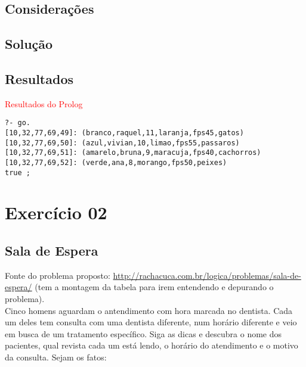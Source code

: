 \documentclass[final,a4paper]{article}
\begin{document}
\subsection{Considerações}

\subsection{Solução}


\subsection{Resultados}

\textcolor{red}{Resultados do  Prolog}

\begin{verbatim}
?- go.
[10,32,77,69,49]: (branco,raquel,11,laranja,fps45,gatos)
[10,32,77,69,50]: (azul,vivian,10,limao,fps55,passaros)
[10,32,77,69,51]: (amarelo,bruna,9,maracuja,fps40,cachorros)
[10,32,77,69,52]: (verde,ana,8,morango,fps50,peixes)
true ;
\end{verbatim}



\section{Exercício 02}


\subsection{Sala de Espera}

 Fonte do problema proposto:
  \url{http://rachacuca.com.br/logica/problemas/sala-de-espera/} (tem a montagem da tabela para irem entendendo e depurando o problema).\\
  Cinco homens aguardam o antendimento com hora marcada no dentista. Cada um deles tem consulta com uma dentista diferente, num horário diferente e veio em busca de um tratamento específico.
Siga as dicas e descubra o nome dos pacientes, qual revista cada um está lendo, o horário do atendimento e o motivo da consulta. 
Sejam os fatos:
  
\end{document}

